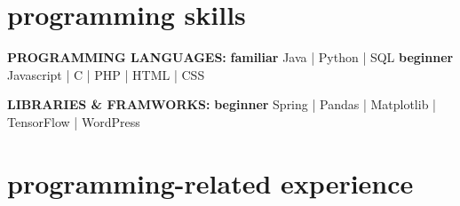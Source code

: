 \documentclass[]{cv-style}          %
\begin{document}
\section{programming skills}
  \vspace{-0.2cm}

\textbf{PROGRAMMING LANGUAGES: } \textbf{familiar } Java | Python | SQL \textbf{ beginner } Javascript | C | PHP | HTML | CSS

\textbf{LIBRARIES \& FRAMWORKS: } \textbf{ beginner } Spring | Pandas | Matplotlib | TensorFlow | WordPress
\vspace{0.5cm}


\section{programming-related experience}
\end{document}
